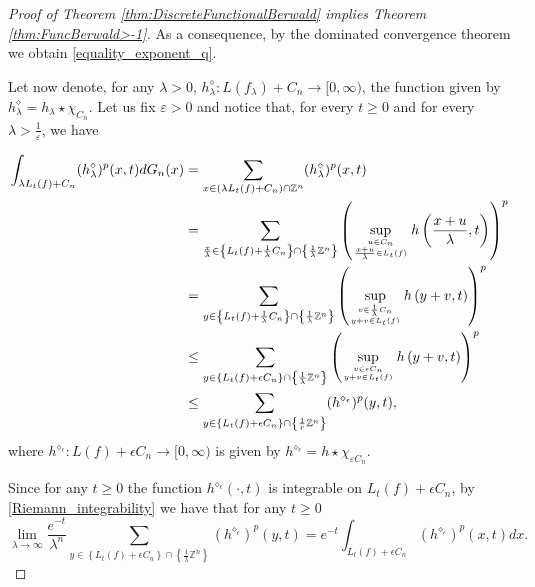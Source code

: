 \documentclass{amsart}
\newcommand{\Z}{\mathbb Z}
\theoremstyle{remark}
\theoremstyle{definition}
\numberwithin{equation}{section}
\begin{document}
\begin{proof}[Proof of Theorem \ref{thm:DiscreteFunctionalBerwald} implies Theorem \ref{thm:FuncBerwald>-1}]
As a consequence, by the dominated convergence theorem we obtain \eqref{equality_exponent_q}.

Let now denote, for any $\lambda>0$, $h_\lambda^{\diamond}: L(f_\lambda)+C_n\to[0,\infty)$, the function given by $h_\lambda^\diamond=h_\lambda\star\chi_{C_n}$. Let us fix $\varepsilon>0$ and notice that, for every $t\geq0$ and for every $\lambda >\frac{1}{\varepsilon}$, we have

\begin{align*}
\int_{\lambda L_t(f)+C_n} (h_\lambda^{\diamond})^p(x,t) dG_n(x) &= \sum_{x \in (\lambda L_t(f) + C_n) \cap \Z^n} (h_\lambda^{\diamond})^p (x,t) \\
&= \sum_{\frac{x}{\lambda} \in \left\{ L_t(f) + \frac{1}{\lambda} C_n \right\} \cap \left\{ \frac{1}{\lambda} \Z^n \right\}}\left( \sup_{u \in C_n\atop \frac{x+u}{\lambda}\in L_t(f)} h\left( \frac{x+u}{\lambda}, t \right) \right)^p \\
&=\sum_{y \in \left\{ L_t(f) + \frac{1}{\lambda} C_n \right\} \cap \left\{ \frac{1}{\lambda} \Z^n \right\}}\left( \sup_{v \in \frac{1}{\lambda} C_n\atop y+v \in L_t(f)} h\left( y+v, t \right) \right)^p \\
& \leq \sum_{y \in \left\{ L_t(f) +\epsilon C_n \right\} \cap \left\{ \frac{1}{\lambda} \Z^n \right\}} \left( \sup_{v \in \epsilon C_n\atop y+v\in L_t(f)} h\left( y+v, t \right) \right)^p \\
& \leq \sum_{y \in \left\{ L_t(f) +\epsilon C_n \right\} \cap \left\{ \frac{1}{r} \Z^n \right\}} (h^{\diamond_{\epsilon}})^p (y,t),
\end{align*}
where $h^{\diamond_{\epsilon}}:L(f)+\epsilon C_n \to [0,\infty)$ is given by $h^{\diamond_{\epsilon}}=h\star\chi_{\varepsilon C_n}$.

Since for any $t\geq0$ the function $h^{\diamond_{\epsilon}}(\cdot,t)$ is integrable on $L_t(f)+\epsilon C_n$, by \eqref{Riemann_integrability} we have that for any $t\geq0$
\[
\lim_{\lambda \to \infty} \frac{e^{-t}}{\lambda^n} \sum_{y \in \left\{ L_t(f) +\epsilon C_n \right\} \cap \left\{ \frac{1}{\lambda} \Z^n \right\}} (h^{\diamond_{\epsilon}})^p(y,t) = e^{-t} \int_{L_t(f) + \epsilon C_n} (h^{\diamond_{\epsilon}})^p (x,t) dx.
\]


\end{proof}
\end{document}
